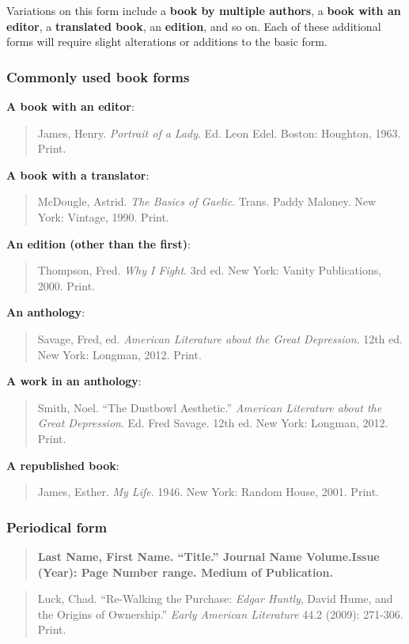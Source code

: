 \documentclass[12pt, hidelinks]{article} %
\newcommand{\tab}{\hspace*{2em}}
\begin{document}
Variations on this form include a {\bf book by multiple authors}, a {\bf book with an editor}, a {\bf translated book}, an {\bf edition}, and so on. Each of these additional forms will require slight alterations or additions to the basic form. 

\subsubsection{Commonly used book forms}

\textbf{A book with an editor}: 
\begin{quote}
James, Henry. \emph{Portrait of a Lady}. Ed. Leon Edel. Boston: Houghton, \tab 1963. Print.
\end{quote}

\textbf{A book with a translator}: 
\begin{quote}
McDougle, Astrid. \emph{The Basics of Gaelic}. Trans. Paddy Maloney. New \tab York: Vintage, 1990. Print.
\end{quote}


\textbf{An edition (other than the first)}:
\begin{quote}
Thompson, Fred. \emph{Why I Fight}. 3rd ed. New York: Vanity Publications, \tab 2000. Print.
\end{quote}

\textbf{An anthology}: 
\begin{quote}
Savage, Fred, ed. \emph{American Literature about the Great Depression}. 12th \tab ed. New York: Longman, 2012. Print.
\end{quote}

\textbf{A work in an anthology}: 
\begin{quote}
Smith, Noel. ``The Dustbowl Aesthetic.'' \emph{American Literature about the \tab Great Depression}. Ed. Fred Savage. 12th ed. New York: Longman, \tab 2012. Print.
\end{quote}

\textbf{A republished book}: 
\begin{quote}
James, Esther. \emph{My Life}. 1946. New York: Random House, 2001. Print.
\end{quote}


\subsubsection{Periodical form}
\begin{quote}
\textbf{Last Name, First Name. ``Title.'' Journal Name Volume.Issue \tab (Year): Page Number range. Medium of Publication.}
\end{quote}
\medskip
\medskip
\begin{quote}
Luck, Chad. ``Re-Walking the Purchase: \emph{Edgar Huntly}, David Hume, and \tab the Origins of Ownership.'' \emph{Early American Literature} 44.2 (2009): \tab 271-306. Print.
\end{quote}
\end{document}
